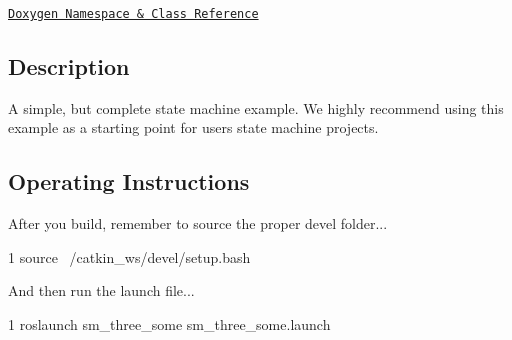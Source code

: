 \href{https://reelrbtx.github.io/SMACC/master/html/namespacesm__three__some.html}{\tt Doxygen Namespace \& Class Reference}

\subsection*{Description}

A simple, but complete state machine example. We highly recommend using this example as a starting point for users state machine projects. \subsection*{Operating Instructions}

After you build, remember to source the proper devel folder...


\begin{DoxyCode}
1 source ~/catkin\_ws/devel/setup.bash
\end{DoxyCode}


And then run the launch file...


\begin{DoxyCode}
1 roslaunch sm\_three\_some sm\_three\_some.launch
\end{DoxyCode}
 